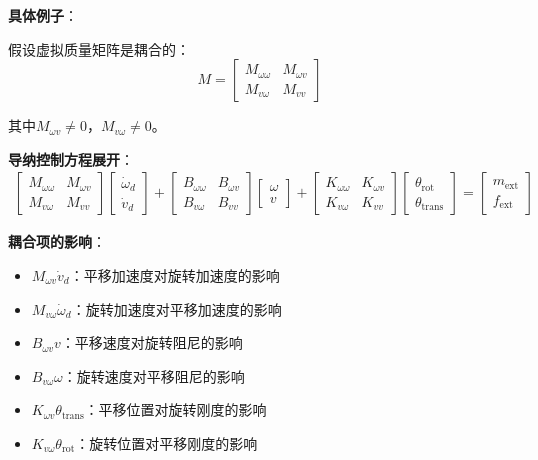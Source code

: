 \documentclass[12pt,a4paper]{article}
\begin{document}
\textbf{具体例子}：

假设虚拟质量矩阵是耦合的：
\begin{equation}
M = \begin{bmatrix}
M_{\omega\omega} & M_{\omega v} \\
M_{v\omega} & M_{vv}
\end{bmatrix}
\end{equation}

其中$M_{\omega v} \neq 0$，$M_{v\omega} \neq 0$。

\textbf{导纳控制方程展开}：
\begin{align}
\begin{bmatrix}
M_{\omega\omega} & M_{\omega v} \\
M_{v\omega} & M_{vv}
\end{bmatrix}
\begin{bmatrix}
\dot{\omega}_d \\
\dot{v}_d
\end{bmatrix}
+ 
\begin{bmatrix}
B_{\omega\omega} & B_{\omega v} \\
B_{v\omega} & B_{vv}
\end{bmatrix}
\begin{bmatrix}
\omega \\
v
\end{bmatrix}
+ 
\begin{bmatrix}
K_{\omega\omega} & K_{\omega v} \\
K_{v\omega} & K_{vv}
\end{bmatrix}
\begin{bmatrix}
\theta_{\text{rot}} \\
\theta_{\text{trans}}
\end{bmatrix}
= 
\begin{bmatrix}
m_{\text{ext}} \\
f_{\text{ext}}
\end{bmatrix}
\end{align}

\textbf{耦合项的影响}：
\begin{itemize}
\item $M_{\omega v}\dot{v}_d$：平移加速度对旋转加速度的影响
\item $M_{v\omega}\dot{\omega}_d$：旋转加速度对平移加速度的影响
\item $B_{\omega v}v$：平移速度对旋转阻尼的影响
\item $B_{v\omega}\omega$：旋转速度对平移阻尼的影响
\item $K_{\omega v}\theta_{\text{trans}}$：平移位置对旋转刚度的影响
\item $K_{v\omega}\theta_{\text{rot}}$：旋转位置对平移刚度的影响
\end{itemize}
\end{document}
